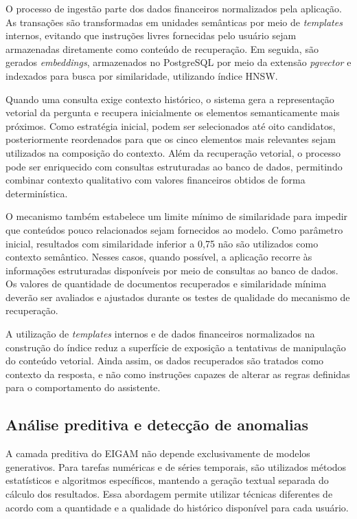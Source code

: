 O processo de ingestão parte dos dados financeiros normalizados pela aplicação. As transações são transformadas em unidades semânticas por meio de \textit{templates} internos, evitando que instruções livres fornecidas pelo usuário sejam armazenadas diretamente como conteúdo de recuperação. Em seguida, são gerados \textit{embeddings}, armazenados no PostgreSQL por meio da extensão \textit{pgvector} e indexados para busca por similaridade, utilizando índice HNSW.

Quando uma consulta exige contexto histórico, o sistema gera a representação vetorial da pergunta e recupera inicialmente os elementos semanticamente mais próximos. Como estratégia inicial, podem ser selecionados até oito candidatos, posteriormente reordenados para que os cinco elementos mais relevantes sejam utilizados na composição do contexto. Além da recuperação vetorial, o processo pode ser enriquecido com consultas estruturadas ao banco de dados, permitindo combinar contexto qualitativo com valores financeiros obtidos de forma determinística.

O mecanismo também estabelece um limite mínimo de similaridade para impedir que conteúdos pouco relacionados sejam fornecidos ao modelo. Como parâmetro inicial, resultados com similaridade inferior a 0,75 não são utilizados como contexto semântico. Nesses casos, quando possível, a aplicação recorre às informações estruturadas disponíveis por meio de consultas ao banco de dados. Os valores de quantidade de documentos recuperados e similaridade mínima deverão ser avaliados e ajustados durante os testes de qualidade do mecanismo de recuperação.

A utilização de \textit{templates} internos e de dados financeiros normalizados na construção do índice reduz a superfície de exposição a tentativas de manipulação do conteúdo vetorial. Ainda assim, os dados recuperados são tratados como contexto da resposta, e não como instruções capazes de alterar as regras definidas para o comportamento do assistente.

\subsection{Análise preditiva e detecção de anomalias}

A camada preditiva do EIGAM não depende exclusivamente de modelos generativos. Para tarefas numéricas e de séries temporais, são utilizados métodos estatísticos e algoritmos específicos, mantendo a geração textual separada do cálculo dos resultados. Essa abordagem permite utilizar técnicas diferentes de acordo com a quantidade e a qualidade do histórico disponível para cada usuário.

